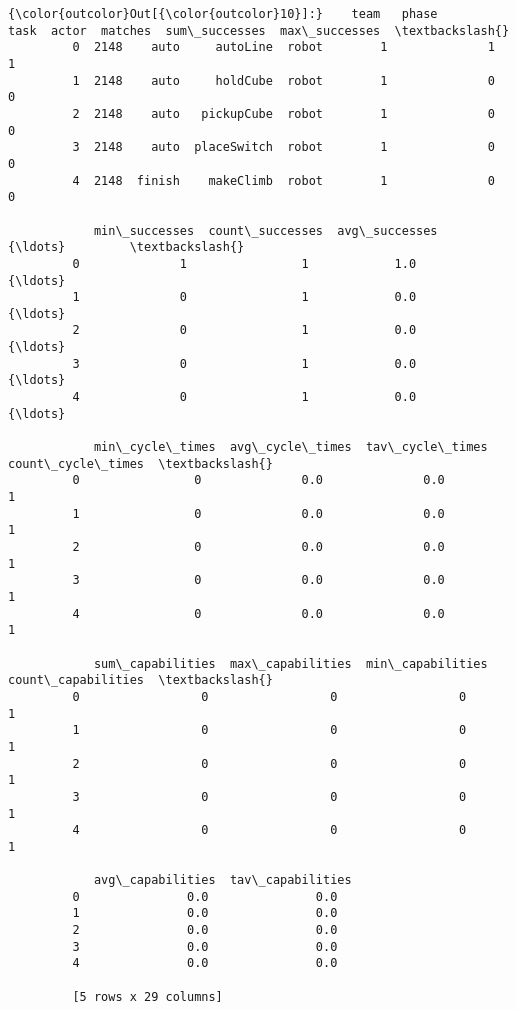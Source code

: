 \documentclass[11pt]{article}
\begin{document}
\begin{Verbatim}[commandchars=\\\{\}]
{\color{outcolor}Out[{\color{outcolor}10}]:}    team   phase         task  actor  matches  sum\_successes  max\_successes  \textbackslash{}
         0  2148    auto     autoLine  robot        1              1              1   
         1  2148    auto     holdCube  robot        1              0              0   
         2  2148    auto   pickupCube  robot        1              0              0   
         3  2148    auto  placeSwitch  robot        1              0              0   
         4  2148  finish    makeClimb  robot        1              0              0   
         
            min\_successes  count\_successes  avg\_successes        {\ldots}         \textbackslash{}
         0              1                1            1.0        {\ldots}          
         1              0                1            0.0        {\ldots}          
         2              0                1            0.0        {\ldots}          
         3              0                1            0.0        {\ldots}          
         4              0                1            0.0        {\ldots}          
         
            min\_cycle\_times  avg\_cycle\_times  tav\_cycle\_times  count\_cycle\_times  \textbackslash{}
         0                0              0.0              0.0                  1   
         1                0              0.0              0.0                  1   
         2                0              0.0              0.0                  1   
         3                0              0.0              0.0                  1   
         4                0              0.0              0.0                  1   
         
            sum\_capabilities  max\_capabilities  min\_capabilities  count\_capabilities  \textbackslash{}
         0                 0                 0                 0                   1   
         1                 0                 0                 0                   1   
         2                 0                 0                 0                   1   
         3                 0                 0                 0                   1   
         4                 0                 0                 0                   1   
         
            avg\_capabilities  tav\_capabilities  
         0               0.0               0.0  
         1               0.0               0.0  
         2               0.0               0.0  
         3               0.0               0.0  
         4               0.0               0.0  
         
         [5 rows x 29 columns]
\end{Verbatim}
            

    
    
    
    
\end{document}

